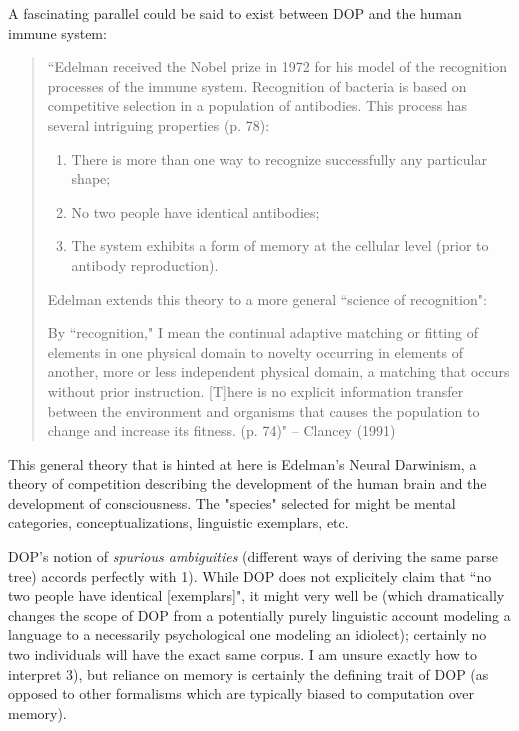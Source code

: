 \documentclass[10pt,a4paper]{article}
\begin{document}
A fascinating parallel could be said to exist between DOP and the human immune
system:

\begin{quote}
	``Edelman received the Nobel prize in 1972 for his model of the
	recognition processes of the immune system. Recognition of bacteria is
	based on competitive selection in a population of antibodies. This
	process has several intriguing properties (p. 78): 
	
	\begin{enumerate} %
	\item There is more than one way to recognize successfully any particular shape;
	\item No two people have identical antibodies;
	\item The system exhibits a form of memory at the cellular level (prior to
	antibody reproduction).
	\end{enumerate}

	Edelman extends this theory to a more general ``science of recognition": 

	By ``recognition," I mean the continual adaptive matching or fitting of
	elements in one physical domain to novelty occurring in elements of
	another, more or less independent physical domain, a matching that
	occurs without prior instruction. [T]here is no explicit information
	transfer between the environment and organisms that causes the
	population to change and increase its fitness. (p. 74)" 
	-- Clancey (1991)
\end{quote}

This general theory that is hinted at here is Edelman's Neural Darwinism,
a theory of competition describing the development of the human brain and
the development of consciousness. The "species" selected for might be mental
categories, conceptualizations, linguistic exemplars, etc. 

DOP's notion of {\em spurious ambiguities} (different ways of deriving the same
parse tree) accords perfectly with 1).  While DOP does not explicitely claim
that ``no two people have identical [exemplars]", it might very well be (which
dramatically changes the scope of DOP from a potentially purely linguistic
account modeling a language to a necessarily psychological one modeling an
idiolect); certainly no two individuals will have the exact same corpus. I am
unsure exactly how to interpret 3), but reliance on memory is certainly the
defining trait of DOP (as opposed to other formalisms which are typically
biased to computation over memory).
\end{document}
